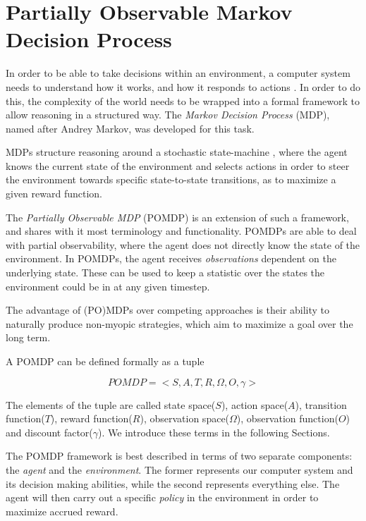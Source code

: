 \section{Partially Observable Markov Decision Process}\label{ref:pomdp}

In order to be able to take decisions within an environment, a computer system needs to understand
how it works, and how it responds to actions . In order to do this, the complexity of the world needs
to be wrapped into a formal framework to allow reasoning in a structured way. The
\textit{Markov Decision Process} (MDP), named after Andrey Markov, was developed for this task.

MDPs structure reasoning around a stochastic state-machine , where the agent knows the current state
of the environment and selects actions in order to steer the environment towards specific
state-to-state transitions, as to maximize a given reward function.

The \textit{Partially Observable MDP} (POMDP) is an extension of such a framework, and shares with it
most terminology and functionality. POMDPs are able to deal with partial observability, where the
agent does not directly know the state of the environment. In POMDPs, the agent receives
\textit{observations} dependent on the underlying state. These can be used to keep a statistic over
the states the environment could be in at any given timestep.

The advantage of (PO)MDPs over competing approaches is their ability to naturally produce non-myopic
strategies, which aim to maximize a goal over the long term.

A POMDP can be defined formally as a tuple

\[ POMDP = <S,A,T,R,\Omega,O,\gamma> \]

The elements of the tuple are called state space($S$), action space($A$), transition function($T$),
reward function($R$), observation space($\Omega$), observation function($O$) and discount
factor($\gamma$). We introduce these terms in the following Sections.

The POMDP framework is best described in terms of two separate components: the \textit{agent} and
the \textit{environment}. The former represents our computer system and its decision making
abilities, while the second represents everything else. The agent will then carry out a specific
\textit{policy} in the environment in order to maximize accrued reward.

